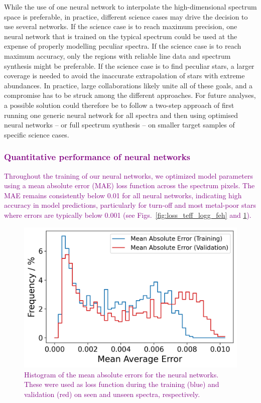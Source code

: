\documentclass[
  journal=pasa,
  manuscript=research-paper, %
  year=2024,
  volume=37
]{cup-journal}
\newcommand{\adjusted}[1]{{\textcolor{purple}{#1}}}
\begin{document}
While the use of one neural network to interpolate the high-dimensional spectrum space is preferable, in practice, different science cases may drive the decision to use several networks.
If the science case is to reach maximum precision, one neural network that is trained on the typical spectrum could be used at the expense of properly modelling peculiar spectra.
If the science case is to reach maximum accuracy, only the regions with reliable line data and spectrum synthesis might be preferable.
If the science case is to find peculiar stars, a larger coverage is needed to avoid the inaccurate extrapolation of stars with extreme abundances.
In practice, large collaborations likely unite all of these goals, and a compromise has to be struck among the different approaches.
For future analyses, a possible solution could therefore be to follow a two-step approach of first running one generic neural network for all spectra and then using optimised neural networks -- or full spectrum synthesis -- on smaller target samples of specific science cases.

\subsubsection{\adjusted{Quantitative performance of neural networks}}

\adjusted{Throughout the training of our neural networks, we optimized model parameters using a mean absolute error (MAE) loss function across the spectrum pixels. The MAE remains consistently below 0.01 for all neural networks, indicating high accuracy in model predictions, particularly for turn-off and most metal-poor stars where errors are typically below 0.001 (see Figs.~\ref{fig:loss_teff_logg_feh} and \ref{fig:loss_histogram}).}

\begin{figure}
    \centering
    \includegraphics[width=\columnwidth]{figures/loss_histogram.png}
    \caption{\adjusted{Histogram of the mean absolute errors  for the neural networks. These were used as loss function during the training (blue) and validation (red) on seen and unseen spectra, respectively.}}
    \label{fig:loss_histogram}
\end{figure}
\end{document}
